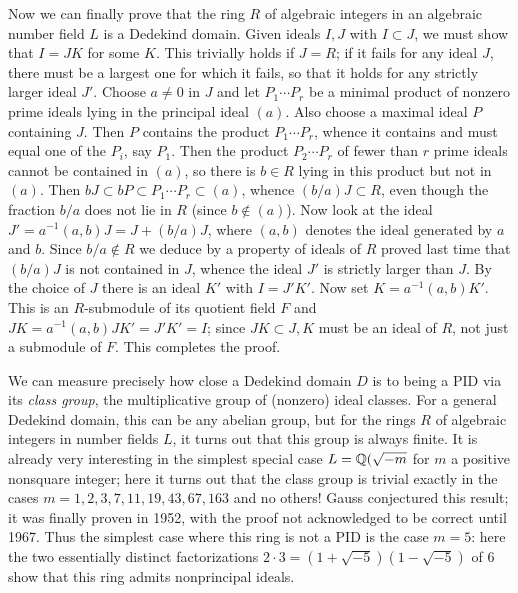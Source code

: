 Now we can finally prove that the ring $R$ of algebraic integers in an algebraic number field $L$ is a Dedekind domain.  Given ideals $I,J$ with $I\subset J$, we must show that $I=JK$ for some $K$.  This trivially holds if $J=R$; if it fails for any ideal $J$, there must be a largest one for which it fails, so that it holds for any strictly larger ideal $J'$.  Choose $a\ne0$ in $J$ and let $P_1\cdots P_r$ be a minimal product of nonzero prime ideals lying in the principal ideal $(a)$.  Also choose a maximal ideal $P$ containing $J$.  Then $P$ contains the product $P_1\cdots P_r$, whence it contains and must equal one of the $P_i$, say $P_1$.  Then the product $P_2\cdots P_r$ of fewer than $r$ prime ideals cannot be contained in $(a)$, so there is $b\in R$ lying in this product but not in $(a)$.  Then
$bJ\subset bP\subset P_1\cdots P_r\subset (a)$, whence $(b/a)J\subset R$, even though the fraction $b/a$ does not lie in $R$ (since $b\notin (a)$).  Now look at the ideal $J' = a^{-1}(a,b)J =
J + (b/a)J$, where $(a,b)$ denotes the ideal generated by $a$ and $b$.  Since $b/a\notin R$ we deduce by a property of ideals of $R$ proved last time that $(b/a)J$ is not contained in $J$, whence the ideal $J'$ is strictly larger than $J$.  By the choice of $J$ there is an ideal $K'$ with $I=J'K'$.  Now set $K= a^{-1}(a,b)K'$.  This is an $R$-submodule of its quotient field $F$ and $JK = a^{-1}(a,b)JK' =
J'K' = I$; since $JK\subset J, K$ must be an ideal of $R$, not just a submodule of $F$.  This completes the proof.

We can measure precisely how close a Dedekind domain $D$ is to being a PID via its {\sl class group}, the multiplicative group of (nonzero) ideal classes.  For a general Dedekind domain, this can be any abelian group, but for the rings $R$ of algebraic integers in number fields $L$, it turns out that this group is always finite.  It is already very interesting in the simplest special case
$L=\Bbb Q(\sqrt{-m}$ for $m$ a positive nonsquare integer; here it turns out that the class group is trivial exactly in the cases $m = 1,2,3,7,11,19,43,67,163$ and no others!  Gauss conjectured this result; it was finally proven in 1952, with the proof not acknowledged to be correct until 1967.  Thus the simplest case where this ring is not a PID is the case $m=5$:  here the two essentially distinct factorizations $2\cdot 3 = (1+\sqrt{-5})(1-\sqrt{-5})$ of 6 show that this ring admits nonprincipal ideals.

